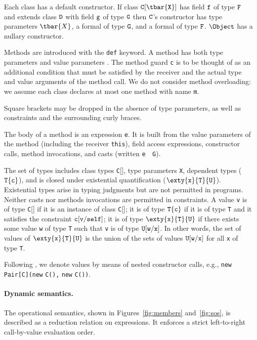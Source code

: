 Each class has a default constructor. If class $\tt C[\tbar{X}]$ has field $\tt f$ of type $\tt F$ and extends class $\tt D$ with field $\tt g$ of type $\tt G$ then $\tt C$'s constructor has type parameters $\tbar{X}$, a formal of type $\tt G$, and a formal of type $\tt F$. $\Object$ has a nullary constructor.

Methods are introduced with the {\tt def} keyword. A method has both type parameters {} and value parameters {}. The method guard {\tt c} is to be thought of as an additional condition that must be satisfied by the receiver and the actual type and value arguments of the method call. We do not consider method overloading: we assume each class declares at most one method with name {\tt m}.

Square brackets may be dropped in the absence of type parameters, as well as \true{} constraints and the surrounding curly braces.

The body of a method is an expression {\tt e}. It is built from the value parameters of the method (including the receiver {\tt this}), field access expressions, constructor calls, method invocations, and casts (written {\tt e}~\as~{\tt G}).

The set of types includes class types {\tt C}[], type parameters {\tt X}, dependent types ($\tt T\{c\}$), and is closed under existential quantification ($\exty{\tt x}{\tt T}{\tt U}$). Existential types arise in typing judgments but are not permitted in programs. Neither casts nor methods invocations are permitted in constraints. A value {\tt v} is of type {\tt C}[] if it is an instance of class {\tt C}[]; it is of type $\tt T\{c\}$ if it is of type {\tt T} and it satisfies the constraint $\tt c[v/self]$; it is of type $\exty{\tt x}{\tt T}{\tt U}$ if there exists some value {\tt w} of type {\tt T} such that {\tt v} is of type $\tt U[w/x]$. In other words, the set of values of $\exty{\tt x}{\tt T}{\tt U}$ is the union of the sets of values $\tt U[w/x]$ for all {\tt x} of type {\tt T}.

Following \FJ{}, we denote values by means of nested constructor calls, e.g.,
\texttt{new} \texttt{Pair[C](new} \texttt{C(),} \texttt{new} \texttt{C())}.

\paragraph{Dynamic semantics.}

The operational semantics, shown in Figures~\ref{fig:members} and~\ref{fig:sos}, is described as a reduction relation on expressions. It enforces a strict left-to-right call-by-value evaluation order.

